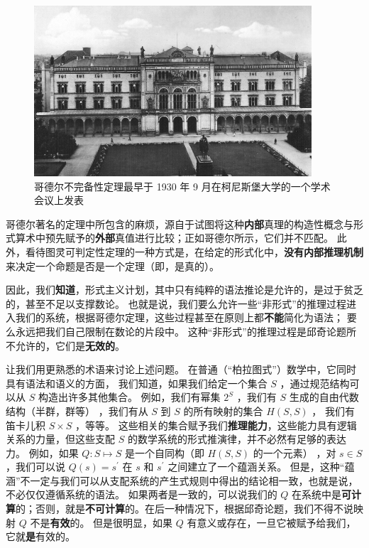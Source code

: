 \documentclass[a4paper,12pt]{article}
\begin{document}
\begin{figure}[ht]
\centering
\includegraphics[height=2.5in]{images/konigsberger_university.jpg}
\caption{哥德尔不完备性定理最早于 1930 年 9 月在柯尼斯堡大学的一个学术会议上发表}
\end{figure}

哥德尔著名的定理\cite{GodelK1931}中所包含的麻烦，源自于试图将这种\textbf{内部}真理的构造性概念与\gls{形式算术}中预先赋予的\textbf{外部}真值进行比较；正如哥德尔所示，它们并不匹配。
此外，看待图灵可判定性定理\cite{TuringA1937}的一种方式是，在给定的\gls{形式化}中，\textbf{没有内部\gls{推理机制}}来决定一个命题是否是一个定理（即，是真的）。

因此，我们\textbf{知道}，\gls{形式主义}计划，其中只有纯粹的\gls{语法}推论是允许的，是过于贫乏的，甚至不足以支撑数论。
也就是说，我们要么允许一些“非形式”的\gls{推理过程}进入我们的系统，根据哥德尔定理，这些过程甚至在原则上都\textbf{不能}简化为\gls{语法}； 要么永远把我们自己限制在数论的片段中。
这种“非形式”的\gls{推理过程}是\gls{邱奇论题}所不允许的，它们是\textbf{无效的}。

让我们用更熟悉的术语来讨论上述问题。 在普通（“柏拉图式”）数学中，它同时具有\gls{语法}和\gls{语义}的方面，
我们知道，如果我们给定一个集合 $S$ ，通过规范结构可以从 $S$ 构造出许多其他集合。
例如，我们有幂集 $2^S$ ，我们有 $S$ \gls{生成}的自由代数结构（半群，群等） ，我们有从 $S$ 到 $S$ 的所有映射的集合 $H(S, S)$ ，
我们有笛卡儿积 $S \times S$ ，等等。
这些相关的集合赋予我们\textbf{\gls{推理能力}}，这些能力具有\gls{逻辑关系}的力量，但这些支配 $S$ 的数学系统的形式推演律，并不必然有足够的表达力。
例如，如果 $Q: S \mapsto S$ 是一个自同构（即 $H(S, S)$ 的一个元素） ，对 $s \in S $，我们可以说 $Q(s) = s^{\prime}$ 在 $s$ 和 $s^{\prime}$ 之间建立了一个\gls{蕴涵关系}。
但是，这种“\gls{蕴涵}”不一定与我们可以从支配系统的产生式规则中得出的结论相一致，也就是说，不必仅仅遵循系统的\gls{语法}。
如果两者是一致的，可以说我们的 $Q$ 在系统中是\textbf{\gls{可计算}}的；否则，就是\textbf{\gls{不可计算}}的。在后一种情况下，根据\gls{邱奇论题}，我们不得不说映射 $Q$ 不是\textbf{有效}的。
但是很明显，如果 $Q$ 有意义或存在，一旦它被赋予给我们，它就\textbf{是}有效的。
\end{document}
